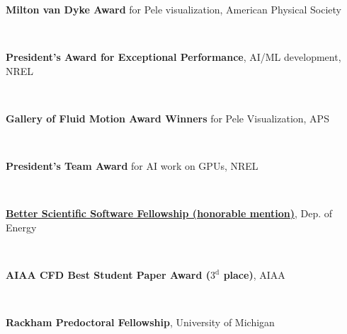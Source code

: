 \documentclass[11pt,letterpaper]{article}
\begin{document}
\begin{minipage}[t]{0.82\textwidth}%
  \textbf{Milton van Dyke Award} for Pele visualization, American Physical Society%
\end{minipage}\hfill%
\begin{minipage}[t]{0.15\textwidth}%
\end{minipage}\\[1ex]%
\begin{minipage}[t]{0.82\textwidth}%
  \textbf{President’s Award for Exceptional Performance}, AI/ML development, NREL%
\end{minipage}\hfill%
\begin{minipage}[t]{0.15\textwidth}%
\end{minipage}\\[1ex]%
\begin{minipage}[t]{0.82\textwidth}%
  \textbf{Gallery of Fluid Motion Award Winners} for Pele Visualization, APS%
\end{minipage}\hfill%
\begin{minipage}[t]{0.15\textwidth}%
\end{minipage}\\[1ex]%
\begin{minipage}[t]{0.82\textwidth}%
  \textbf{President’s Team Award} for AI work on GPUs, NREL%
\end{minipage}\hfill%
\begin{minipage}[t]{0.15\textwidth}%
\end{minipage}\\[1ex]%
\begin{minipage}[t]{0.82\textwidth}%
  \href{https://bssw.io/blog_posts/introducing-the-2018-bssw-fellows}{\textbf{Better Scientific Software Fellowship (honorable mention)}}, Dep. of Energy%
\end{minipage}\hfill%
\begin{minipage}[t]{0.15\textwidth}%
\end{minipage}\\[1ex]%
\begin{minipage}[t]{0.82\textwidth}%
  \textbf{AIAA CFD Best Student Paper Award ($3^{\text{d}}$ place)}, AIAA%
\end{minipage}\hfill%
\begin{minipage}[t]{0.15\textwidth}%
\end{minipage}\\[1ex]%
\begin{minipage}[t]{0.82\textwidth}%
  \textbf{Rackham Predoctoral Fellowship}, University of Michigan%
\end{minipage}\hfill%
\end{document}
